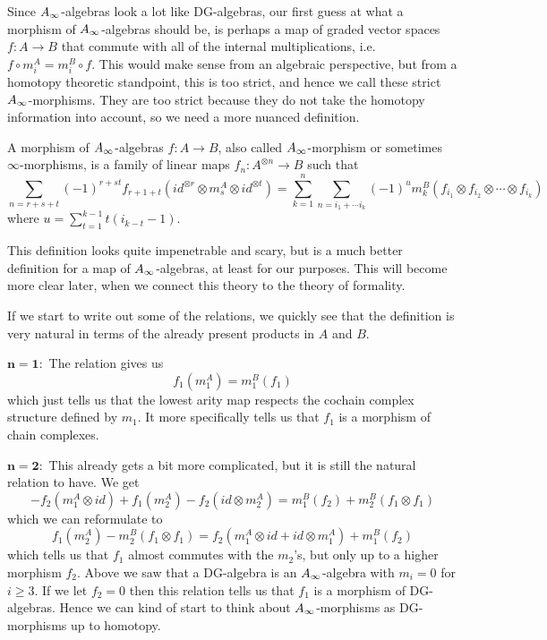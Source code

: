 Since $\A$-algebras look a lot like DG-algebras, our first guess at what a morphism of $\A$-algebras should be, is perhaps a map of graded vector spaces $f:A\longrightarrow B$ that commute with all of the internal multiplications, i.e. $f\circ m^A_i = m^B_i\circ f$. This would make sense from an algebraic perspective, but from a homotopy theoretic standpoint, this is too strict, and hence we call these strict $\A$-morphisms. They are too strict because they do not take the homotopy information into account, so we need a more nuanced definition. 

\begin{definition}[$\A$-morphism]
A morphism of $\A$-algebras $f:A\rightarrow B$, also called $\A$-morphism or sometimes $\infty$-morphisms, is a family of linear maps $f_n:A^{\otimes n}\rightarrow B$ such that 
\begin{equation*}
    \sum_{n = r+s+t}(-1)^{r+st}f_{r+1+t}(id^{\otimes r}\otimes m_s^A \otimes id^{\otimes t}) = \sum_{k=1}^{n}\sum_{n=i_1+\cdots i_k}(-1)^{u} m_k^B(f_{i_1}\otimes f_{i_2}\otimes \cdots \otimes f_{i_k})
\end{equation*}
where $u=\displaystyle \sum_{t=1}^{k-1}t(i_{k-t}-1)$.
\end{definition}

This definition looks quite impenetrable and scary, but is a much better definition for a map of $\A$-algebras, at least for our purposes. This will become more clear later, when we connect this theory to the theory of formality.  

If we start to write out some of the relations, we quickly see that the definition is very natural in terms of the already present products in $A$ and $B$. 

$\mathbf{n=1:}$ The relation gives us
\begin{equation*}
    f_1(m_1^A) = m_1^B(f_1)
\end{equation*}
which just tells us that the lowest arity map respects the cochain complex structure defined by $m_1$. It more specifically tells us that $f_1$ is a morphism of chain complexes. 

$\mathbf{n=2:}$ This already gets a bit more complicated, but it is still the natural relation to have. We get
\begin{equation*}
    -f_2(m_1^A\otimes id)+f_1(m_2^A)-f_2(id\otimes m_2^A) = m_1^B(f_2)+m_2^B(f_1\otimes f_1)
\end{equation*}
which we can reformulate to 
\begin{equation*}
    f_1(m_2^A)-m_2^B(f_1\otimes f_1) = f_2(m_1^A\otimes id + id\otimes m_1^A) + m_1^B(f_2)
\end{equation*}
which tells us that $f_1$ almost commutes with the $m_2$'s, but only up to a higher morphism $f_2$. Above we saw that a DG-algebra is an $\A$-algebra with $m_i=0$ for $i\geq 3$. If we let $f_2=0$ then this relation tells us that $f_1$ is a morphism of DG-algebras. Hence we can kind of start to think about $\A$-morphisms as DG-morphisms up to homotopy.  

